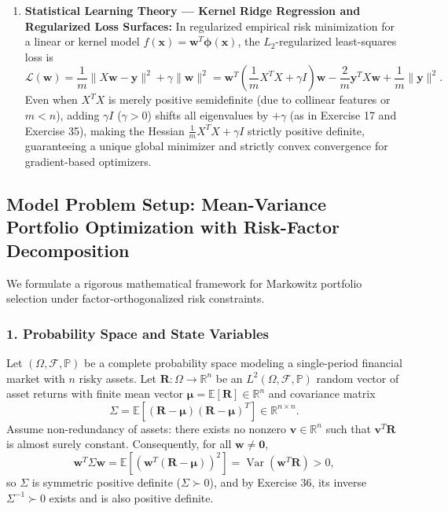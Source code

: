 \documentclass[11pt, letterpaper]{article}
\theoremstyle{definition}
\theoremstyle{remark}
\begin{document}
\begin{enumerate}
    \item \textbf{Statistical Learning Theory --- Kernel Ridge Regression and Regularized Loss Surfaces:}
    In regularized empirical risk minimization for a linear or kernel model $f(\mathbf{x}) = \mathbf{w}^T \boldsymbol{\phi}(\mathbf{x})$, the $L_2$-regularized least-squares loss is
    \[
    \mathcal{L}(\mathbf{w}) = \frac{1}{m}\|X\mathbf{w} - \mathbf{y}\|^2 + \gamma \|\mathbf{w}\|^2 = \mathbf{w}^T \left(\frac{1}{m} X^T X + \gamma I\right)\mathbf{w} - \frac{2}{m}\mathbf{y}^T X \mathbf{w} + \frac{1}{m}\|\mathbf{y}\|^2.
    \]
    Even when $X^T X$ is merely positive semidefinite (due to collinear features or $m < n$), adding $\gamma I$ ($\gamma > 0$) shifts all eigenvalues by $+\gamma$ (as in Exercise 17 and Exercise 35), making the Hessian $\frac{1}{m}X^T X + \gamma I$ strictly positive definite, guaranteeing a unique global minimizer and strictly convex convergence for gradient-based optimizers.
\end{enumerate}

\subsection{Model Problem Setup: Mean-Variance Portfolio Optimization with Risk-Factor Decomposition}

We formulate a rigorous mathematical framework for Markowitz portfolio selection under factor-orthogonalized risk constraints.

\subsubsection*{1. Probability Space and State Variables}
Let $(\Omega, \mathcal{F}, \mathbb{P})$ be a complete probability space modeling a single-period financial market with $n$ risky assets. Let $\mathbf{R} : \Omega \to \mathbb{R}^n$ be an $L^2(\Omega, \mathcal{F}, \mathbb{P})$ random vector of asset returns with finite mean vector $\boldsymbol{\mu} = \mathbb{E}[\mathbf{R}] \in \mathbb{R}^n$ and covariance matrix
\[
\Sigma = \mathbb{E}\left[(\mathbf{R} - \boldsymbol{\mu})(\mathbf{R} - \boldsymbol{\mu})^T\right] \in \mathbb{R}^{n \times n}.
\]
Assume non-redundancy of assets: there exists no nonzero $\mathbf{v} \in \mathbb{R}^n$ such that $\mathbf{v}^T \mathbf{R}$ is almost surely constant. Consequently, for all $\mathbf{w} \ne \mathbf{0}$,
\[
\mathbf{w}^T \Sigma \mathbf{w} = \mathbb{E}\left[\left(\mathbf{w}^T(\mathbf{R} - \boldsymbol{\mu})\right)^2\right] = \operatorname{Var}(\mathbf{w}^T \mathbf{R}) > 0,
\]
so $\Sigma$ is symmetric positive definite ($\Sigma \succ 0$), and by Exercise 36, its inverse $\Sigma^{-1} \succ 0$ exists and is also positive definite.
\end{document}
